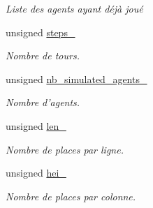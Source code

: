 \begin{DoxyCompactItemize}
\begin{DoxyCompactList}\small\item\em Liste des agents ayant déjà joué \end{DoxyCompactList}\item 
\hypertarget{classWorld_a747132820aba737926418d482571d7d3}{unsigned \hyperlink{classWorld_a747132820aba737926418d482571d7d3}{steps\-\_\-}}\label{classWorld_a747132820aba737926418d482571d7d3}

\begin{DoxyCompactList}\small\item\em Nombre de tours. \end{DoxyCompactList}\item 
\hypertarget{classWorld_a171ee3cda37e3f0d643407d7f5e22a4e}{unsigned \hyperlink{classWorld_a171ee3cda37e3f0d643407d7f5e22a4e}{nb\-\_\-simulated\-\_\-agents\-\_\-}}\label{classWorld_a171ee3cda37e3f0d643407d7f5e22a4e}

\begin{DoxyCompactList}\small\item\em Nombre d'agents. \end{DoxyCompactList}\item 
\hypertarget{classWorld_a37b008437fd73a5d4d6851a88ba61167}{unsigned \hyperlink{classWorld_a37b008437fd73a5d4d6851a88ba61167}{len\-\_\-}}\label{classWorld_a37b008437fd73a5d4d6851a88ba61167}

\begin{DoxyCompactList}\small\item\em Nombre de places par ligne. \end{DoxyCompactList}\item 
\hypertarget{classWorld_a988746f4879237d7740e52fa36b16555}{unsigned \hyperlink{classWorld_a988746f4879237d7740e52fa36b16555}{hei\-\_\-}}\label{classWorld_a988746f4879237d7740e52fa36b16555}

\begin{DoxyCompactList}\small\item\em Nombre de places par colonne. \end{DoxyCompactList}\end{DoxyCompactItemize}
